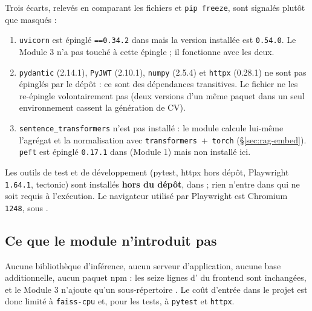 Trois écarts, relevés en comparant les fichiers et \texttt{pip freeze}, sont
signalés plutôt que masqués :

\begin{enumerate}[label=\arabic*.*,leftmargin=*,itemsep=2pt]
  \item \texttt{uvicorn} est épinglé \texttt{==0.34.2} dans
         mais la version installée est
        \texttt{0.54.0}. Le Module 3 n'a pas touché à cette épingle ; il
        fonctionne avec les deux.
  \item \texttt{pydantic} (2.14.1), \texttt{PyJWT} (2.10.1), \texttt{numpy}
        (2.5.4) et \texttt{httpx} (0.28.1) ne sont pas épinglés par le dépôt :
        ce sont des dépendances transitives. Le fichier
         ne les re-épingle
        volontairement pas (deux versions d'un même paquet dans un seul
        environnement cassent la génération de CV).
  \item \texttt{sentence\_transformers} n'est pas installé : le module calcule
        lui-même l'agrégat et la normalisation avec
        \texttt{transformers}~+~\texttt{torch} (§\ref{sec:rag-embed}).
        \texttt{peft} est épinglé \texttt{0.17.1} dans 
        (Module 1) mais non installé ici.
\end{enumerate}

Les outils de test et de développement (pytest, httpx hors dépôt, Playwright
\texttt{1.64.1}, tectonic) sont installés \textbf{hors du dépôt}, dans
 ; rien n'entre dans  qui ne soit
requis à l'exécution. Le navigateur utilisé par Playwright est Chromium
\texttt{1248}, sous .

\subsection{Ce que le module n'introduit pas}

Aucune bibliothèque d'inférence, aucun serveur d'application, aucune base
additionnelle, aucun paquet npm : les seize lignes d' du
frontend sont inchangées, et le Module 3 n'ajoute qu'un sous-répertoire
. Le coût d'entrée dans le projet est donc
limité à \texttt{faiss-cpu} et, pour les tests, à \texttt{pytest} et
\texttt{httpx}.
